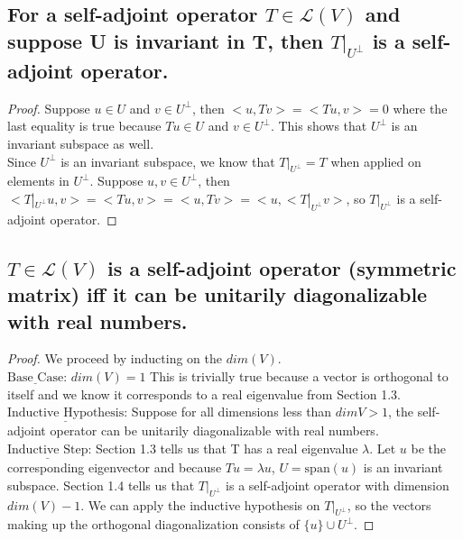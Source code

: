 \documentclass{article}
\begin{document}
\subsection{For a self-adjoint operator $T \in \mathcal{L}(V)$ and suppose U is invariant in T, then $T|_{U^{\bot}}$ is a self-adjoint operator.}
\begin{proof}
Suppose $u \in U$ and $v \in U^{\bot}$, then $<u, Tv> = <Tu, v> = 0$ where the last equality is true because $Tu \in U$ and $v \in U^{\bot}$. This shows that $U^{\bot}$ is an invariant subspace as well. \\[1em]
Since $U^{\bot}$ is an invariant subspace, we know that $T|_{U^{\bot}} = T$ when applied on elements in $U^{\bot}$. Suppose $u, v \in U^{\bot}$, then $<T|_{U^{\bot}}u, v> = <Tu, v> = <u, Tv> = <u, <T|_{U^{\bot}}v>$, so $T|_{U^{\bot}}$ is a self-adjoint operator.
\end{proof}

\subsection{$T \in \mathcal{L}(V)$ is a self-adjoint operator (symmetric matrix) iff it can be unitarily diagonalizable with real numbers.}
\begin{proof}
We proceed by inducting on the $dim(V)$. \\
$\underline{\text{Base Case}}$: $dim(V) = 1$ This is trivially true because a vector is orthogonal to itself and we know it corresponds to a real eigenvalue from Section 1.3. \\ 
$\underline{\text{Inductive Hypothesis}}$: Suppose for all dimensions less than $dim V > 1$, the self-adjoint operator can be unitarily diagonalizable with real numbers.\\
$\underline{\text{Inductive Step}}$: Section 1.3 tells us that T has a real eigenvalue $\lambda$. Let $u$ be the corresponding eigenvector and because $Tu = \lambda u$, $U = \text{span}(u)$ is an invariant subspace. Section 1.4 tells us that $T|_{U^{\bot}}$ is a self-adjoint operator with dimension $dim(V)-1$. We can apply the inductive hypothesis on $T|_{U^{\bot}}$, so the vectors making up the orthogonal diagonalization consists of $\{u\} \cup U^{\bot}$.
\end{proof}
\end{document}
